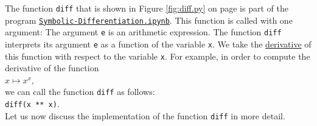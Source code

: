 \noindent
The function \texttt{diff} that is shown in Figure \ref{fig:diff.py} on page \pageref{fig:diff.py} is part
of the program
\href{https://github.com/karlstroetmann/Logic/blob/master/Python/Symbolic-Differentiation.ipynb}{\texttt{Symbolic-Differentiation.ipynb}}.
This function is called with one argument:
The argument \texttt{e} is an arithmetic expression.
The function \texttt{diff} interprets its argument \texttt{e} as a function of the variable
\texttt{x}.  We take the \href{https://en.wikipedia.org/wiki/Derivative}{derivative} of this
function with respect to the variable \texttt{x}.  For example, in order to compute the derivative of
the function
\\[0.2cm]
\hspace*{1.3cm}
$x \mapsto x^x$,
\\[0.2cm]
we can call the function  \texttt{diff} as follows:
\\[0.2cm]
\hspace*{1.3cm}
\texttt{diff(x ** x)}.
\\[0.2cm]
Let us now discuss the implementation of the function \texttt{diff} in more detail.  
